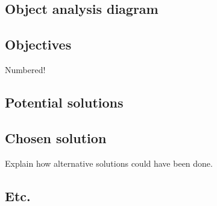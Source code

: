 \subsection{Object analysis diagram}
\lipsum
\subsection{Objectives}

Numbered!

\subsection{Potential solutions}
\lipsum
\subsection{Chosen solution}

Explain how alternative solutions could have been done.

\subsection{Etc.}
\lipsum
